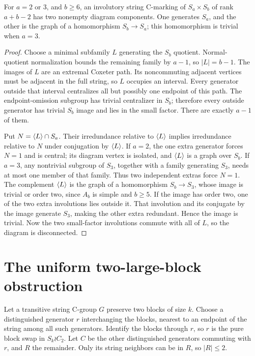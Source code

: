 \begin{lemma}\label{smallfactor}
For $a=2$ or $3$, and $b\geq6$, an involutory string C-marking of
$S_a\times S_b$ of rank $a+b-2$ has two nonempty diagram components.
One generates $S_a$, and the other is the graph of a homomorphism
$S_b\to S_a$; this homomorphism is trivial when $a=3$.
\end{lemma}
\begin{proof}
Choose a minimal subfamily $L$ generating the $S_b$ quotient.
Normal-quotient normalization bounds the remaining family by $a-1$,
so $|L|=b-1$. The images of $L$ are an extremal Coxeter path.
Its noncommuting adjacent vertices must be adjacent in the full
string, so $L$ occupies an interval. Every generator outside that
interval centralizes all but possibly one endpoint of this path.
The endpoint-omission subgroup has trivial centralizer in $S_b$;
therefore every outside generator has trivial $S_b$ image and lies
in the small factor. There are exactly $a-1$ of them.

Put $N=\langle L\rangle\cap S_a$. Their irredundance relative to $\langle L\rangle$
implies irredundance relative to $N$ under conjugation by $\langle L\rangle$.
If $a=2$, the one extra generator forces $N=1$ and is central;
its diagram vertex is isolated, and $\langle L\rangle$ is a graph over $S_b$.
If $a=3$, any nontrivial subgroup
of $S_3$, together with a family generating $S_3$, needs at most one
member of that family. Thus two independent extras force $N=1$.
The complement $\langle L\rangle$ is the graph of a homomorphism
$S_b\to S_3$, whose image is trivial or order two, since $A_b$ is
simple and $b\geq5$. If the image has order two, one of the two
extra involutions lies outside it. That involution and its conjugate
by the image generate $S_3$, making the other extra redundant.
Hence the image is trivial. Now the two small-factor involutions
commute with all of $L$, so the diagram is disconnected.
\end{proof}

\section{The uniform two-large-block obstruction}
Let a transitive string C-group $G$ preserve two blocks of size $k$.
Choose a distinguished generator $r$ interchanging the blocks,
nearest to an endpoint of the string among all such generators.
Identify the blocks through $r$, so $r$ is the pure block swap in
$S_k\wr C_2$. Let $C$ be the other distinguished generators commuting
with $r$, and $R$ the remainder. Only its string neighbors can be in
$R$, so $|R|\leq2$.

